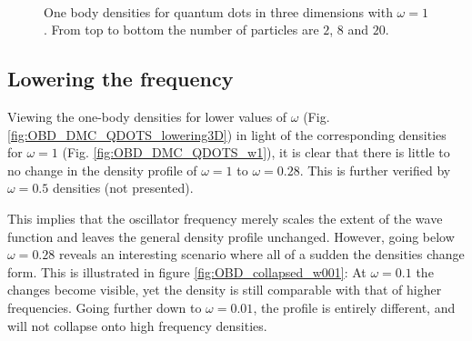 \begin{figure}
\begin{center}
     \\
  \caption{One body densities for quantum dots in three dimensions with $\omega=1$. From top to bottom the number of particles are $2$, $8$ and $20$.}
  \label{fig:OBD_QDOTS3D_highfreq}
 \end{center}
\end{figure}



\setlength{\tabcolsep}{6pt}
\captionsetup[subfloat]{labelformat=parens}
\clearpage








\subsection{Lowering the frequency}

Viewing the one-body densities for lower values of $\omega$ (Fig. \ref{fig:OBD_DMC_QDOTS_lowering3D}) in light of the corresponding densities for $\omega=1$ (Fig. \ref{fig:OBD_DMC_QDOTS_w1}), it is clear that there is little to no change in the density profile of $\omega=1$ to $\omega=0.28$. This is further verified by $\omega=0.5$ densities (not presented). 

This implies that the oscillator frequency merely scales the extent of the wave function and leaves the general density profile unchanged. However, going below $\omega=0.28$ reveals an interesting scenario where all of a sudden the densities change form. This is illustrated in figure \ref{fig:OBD_collapsed_w001}: At $\omega=0.1$ the changes become visible, yet the density is still comparable with that of higher frequencies. Going further down to $\omega=0.01$, the profile is entirely different, and will not collapse onto high frequency densities.

